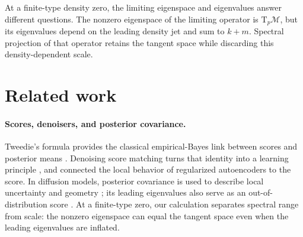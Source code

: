 \documentclass[10pt]{article}
\theoremstyle{c2fup}
\newcommand{\M}{\mathcal{M}}
\newcommand{\T}{\mathrm{T}}
\begin{document}
\begin{takeawaybox}
At a finite-type density zero, the limiting eigenspace and eigenvalues answer different questions.  The nonzero eigenspace of the limiting operator is $\T_p\M$, but its eigenvalues depend on the leading density jet and sum to $k+m$.  Spectral projection of that operator retains the tangent space while discarding this density-dependent scale.
\end{takeawaybox}

\section{Related work}
\label{sec:related}

\paragraph{Scores, denoisers, and posterior covariance.}
Tweedie's formula provides the classical empirical-Bayes link between scores and posterior means \citep{efron2011tweedie}.  Denoising score matching turns that identity into a learning principle \citep{vincent2011connection}, and \citet{alain2014regularized} connected the local behavior of regularized autoencoders to the score.  In diffusion models, posterior covariance is used to describe local uncertainty and geometry \citep{manor2024posterior,kadkhodaie2024generalization}; its leading eigenvalues also serve as an out-of-distribution score \citep{shoushtari2026eigenscore}.  At a finite-type zero, our calculation separates spectral range from scale: the nonzero eigenspace can equal the tangent space even when the leading eigenvalues are inflated.
\end{document}
